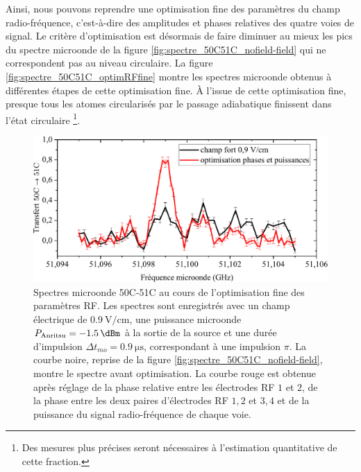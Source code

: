 Ainsi, nous pouvons reprendre une optimisation fine des paramètres du champ radio-fréquence, c'est-à-dire des amplitudes et phases relatives des quatre voies de signal.
Le critère d'optimisation est désormais de faire diminuer au mieux les pics du spectre microonde de la figure \eqref{fig:spectre_50C51C_nofield-field} qui ne correspondent pas au niveau circulaire.
La figure \eqref{fig:spectre_50C51C_optimRFfine} montre les spectres microonde obtenus à différentes étapes de cette optimisation fine.
\`A l'issue de cette optimisation fine, presque tous les atomes circularisés par le passage adiabatique finissent dans l'état circulaire \footnote{
Des mesures plus précises seront nécessaires à l'estimation quantitative de cette fraction.
}.

\begin{figure}[!h]
\centering
\includegraphics[width=.9\linewidth]{figures/circulars/spectre_50C51C_optimRFfine}
\caption[Spectres microonde 50C-51C au cours de l'optimisation fine des paramètres RF]{
Spectres microonde 50C-51C au cours de l'optimisation fine des paramètres RF.
Les spectres sont enregistrés avec un champ électrique de $\SI{0.9}{\V/\cm}$, une puissance microonde $P_{\text{Anritsu}} = \SI{-1.5}{\dBm}$ à la sortie de la source et une durée d'impulsion $\Delta t _{mo} = \SI{0.9}{\us}$, correspondant à une impulsion $\pi$.
La courbe noire, reprise de la figure \eqref{fig:spectre_50C51C_nofield-field}, montre le spectre avant optimisation.
La courbe rouge est obtenue après réglage de la phase relative entre les électrodes RF $1$ et $2$, de la phase entre les deux paires d'électrodes RF $1,2$ et $3,4$ et de la puissance du signal radio-fréquence de chaque voie.
}
\label{fig:spectre_50C51C_optimRFfine}
\end{figure}
%


